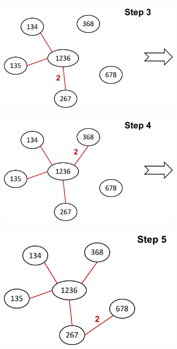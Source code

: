 \documentclass{article}
\begin{document}
\begin{figure}[h]
\begin{subfigure}[b]{0.315\textwidth}
  \end{subfigure}
  \hspace{0.1cm}
    \begin{subfigure}[b]{0.315\textwidth}
  	\centering
  	\includegraphics[width=\columnwidth]{3b4.pdf}
  \end{subfigure}
  \hspace{0.1cm}
  \begin{subfigure}[b]{0.315\textwidth}
    \centering
  	\includegraphics[width=\columnwidth]{3b5.pdf}
  \end{subfigure}
  \hspace{0.1cm}
  \begin{subfigure}[b]{0.28\textwidth}
    \centering
  	\includegraphics[width=\columnwidth]{3b6.pdf}
  \end{subfigure}
\end{figure}
\end{document}
